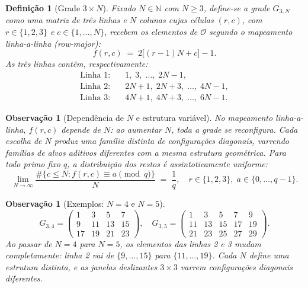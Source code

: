 \documentclass{article}
\newtheorem{remark}[proposition]{Observação}
\newtheorem{definition}[proposition]{Definição}
\begin{document}
	\begin{definition}[Grade $3 \times N$]
		\label{def:grade}
		Fixado $N \in \mathbb{N}$ com $N \geq 3$, define-se a \emph{grade}
		$G_{3,N}$ como uma matriz de três linhas e $N$ colunas cujas
		células $(r, c)$, com $r \in \{1,2,3\}$ e $c \in \{1,\ldots,N\}$,
		recebem os elementos de $\mathcal{O}$ segundo o mapeamento
		\emph{linha-a-linha} (row-major):
		\[
		f(r, c) \;=\; 2\bigl[(r-1)N + c\bigr] - 1.
		\]
		As três linhas contêm, respectivamente:
		\begin{align*}
			\text{Linha 1:} &\quad 1,\; 3,\; \ldots,\; 2N-1, \\
			\text{Linha 2:} &\quad 2N+1,\; 2N+3,\; \ldots,\; 4N-1, \\
			\text{Linha 3:} &\quad 4N+1,\; 4N+3,\; \ldots,\; 6N-1.
		\end{align*}
	\end{definition}
	
	\begin{remark}[Depend\^encia de $N$ e estrutura vari\'avel]
		No mapeamento linha-a-linha, $f(r,c)$ depende de $N$: ao aumentar $N$,
		toda a grade se reconfigura. Cada escolha de $N$ produz uma
		\emph{fam\'ilia distinta} de configura\c{c}\~oes diagonais, varrendo
		fam\'ilias de alvos aditivos diferentes com a mesma estrutura geom\'etrica.
		Para todo primo fixo $q$, a distribui\c{c}\~ao dos restos \'e assintoticamente
		uniforme:
		\[
		\lim_{N \to \infty}
		\frac{\#\{c \leq N : f(r,c) \equiv a \pmod{q}\}}{N}
		\;=\; \frac{1}{q},
		\quad r \in \{1,2,3\},\; a \in \{0,\ldots,q-1\}.
		\]
	\end{remark}
	
	\begin{remark}[Exemplos: $N = 4$ e $N = 5$]
		\label{rem:exemplos}
		\[
		G_{3,4} = \begin{pmatrix}
			1 & 3 & 5 & 7 \\ 9 & 11 & 13 & 15 \\ 17 & 19 & 21 & 23
		\end{pmatrix},
		\quad
		G_{3,5} = \begin{pmatrix}
			1 & 3 & 5 & 7 & 9 \\ 11 & 13 & 15 & 17 & 19 \\ 21 & 23 & 25 & 27 & 29
		\end{pmatrix}.
		\]
		Ao passar de $N=4$ para $N=5$, os elementos das linhas 2 e 3 mudam
		completamente: linha 2 vai de $\{9,\ldots,15\}$ para $\{11,\ldots,19\}$.
		Cada $N$ define uma estrutura distinta, e as janelas deslizantes $3\times 3$
		varrem configura\c{c}\~oes diagonais diferentes.
	\end{remark}
	
\end{document}
